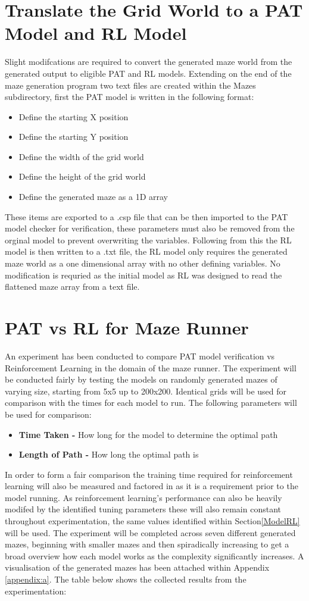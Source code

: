 \documentclass[twoside, 12pt, a4paper]{article}
\begin{document}
\section{Translate the Grid World to a PAT Model and RL Model}
Slight modifcations are required to convert the generated maze world from the generated output to eligible PAT and RL models. Extending on the end of the maze generation program two text files are created within the Mazes subdirectory, first the PAT model is written in the following format:
\begin{itemize}
 \item Define the starting X position
 \item Define the starting Y position
 \item Define the width of the grid world
 \item Define the height of the grid world
 \item Define the generated maze as a 1D array
\end{itemize}
These items are exported to a .csp file that can be then imported to the PAT model checker for verification, these parameters must also be removed from the orginal model to prevent overwriting the variables. Following from this the RL model is then written to a .txt file, the RL model only requires the generated maze world as a one dimensional array with no other defining variables. No modification is requried as the initial model as RL was designed to read the flattened maze array from a text file.

\section{PAT vs RL for Maze Runner}
An experiment has been conducted to compare PAT model verification vs Reinforcement Learning in the domain of the maze runner. The experiment will be conducted fairly by testing the models on randomly generated mazes of varying size, starting from 5x5 up to 200x200. Identical grids will be used for comparison with the times for each model to run. The following parameters will be used for comparison:
\begin {itemize}
\item \textbf{Time Taken -} How long for the model to determine the optimal path
\item \textbf{Length of Path -} How long the optimal path is
\end {itemize}
In order to form a fair comparison the training time required for reinforcement learning will also be measured and factored in as it is a requirement prior to the model running. As reinforcement learning's performance can also be heavily modifed by the identified tuning parameters these will also remain constant throughout experimentation, the same values identified within Section\ref{ModelRL} will be used.  The experiment will be completed across seven different generated mazes, beginning with smaller mazes and then spiradically increasing to get a broad overview how each model works as the complexity significantly increases. A visualisation of the generated mazes has been attached within Appendix \ref{appendix:a}.  The table below shows the collected results from the experimentation:
\end{document}
